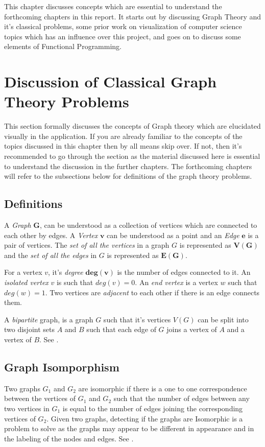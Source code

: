 
This chapter discusses concepts which are essential to understand the
forthcoming chapters in this report. It starts out by discussing Graph Theory
and it's classical problems, some prior work on visualization of computer
science topics which has an influence over this project, and goes on to discuss
some elements of Functional Programming.

\section{Discussion of Classical Graph Theory Problems}
This section formally discusses the concepts of Graph theory which are
elucidated visually in the application.  If you are already familiar to the
concepts of the topics discussed in this chapter then by all means skip over.
If not, then it's recommended to go through the section as the material
discussed here is essential to understand the discussion in the further
chapters.  The forthcoming chapters will refer to the subsections below for
definitions of the graph theory problems.

\subsection{Definitions}
A \emph{Graph} $\boldsymbol{G}$, can be understood as a collection of vertices which are
connected to each other by edges.  A \emph{Vertex} $\boldsymbol{v}$ can be understood as a
point and an \emph{Edge} $\boldsymbol{e}$ is a pair of vertices.  The \emph{set of all the vertices}
in a graph $G$ is represented as $\boldsymbol{V(G)}$ and the \emph{set of all the
edges} in $G$ is represented as $\boldsymbol{E(G)}$.

For a vertex $v$, it's \emph{degree} $\boldsymbol{deg(v)}$ is the number of edges
connected to it.  An \emph{isolated vertex} $v$ is such that $deg(v) = 0$. An
\emph{end vertex} is a vertex $w$ such that $deg(w) = 1$.  Two vertices are
\emph{adjacent} to each other if there is an edge connects them.

A \emph{bipartite} graph, is a graph $G$ such that it's vertices $V(G)$ can
be split into two disjoint sets $A$ and $B$ such that each edge of $G$ joins a
vertex of $A$ and a vertex of $B$. See \cite{Newman10}.


\subsection{Graph Isomporphism}
Two graphs $G_1$ and $G_2$ are isomorphic if there is a one to one correspondence
between the vertices of $G_1$ and $G_2$ such that the number of edges between any
two vertices in $G_1$ is equal to the number of edges joining the corresponding
vertices of $G_2$.  Given two graphs, detecting if the graphs are Isomorphic is
a problem to solve as the graphs may appear to be different in appearance and
in the labeling of the nodes and edges. See \cite{Newman10}.

